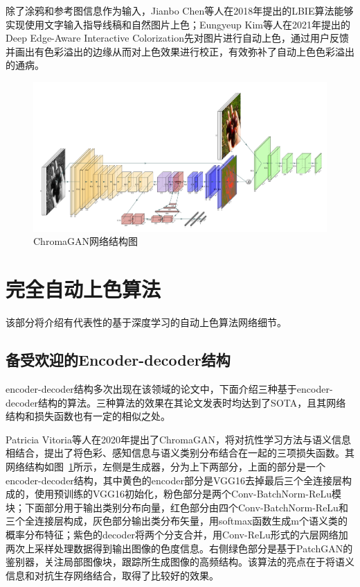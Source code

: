 \documentclass[conference]{IEEEtran}
\begin{document}
除了涂鸦和参考图信息作为输入，Jianbo Chen等人在2018年提出的LBIE算法\cite{chen2018language}能够实现使用文字输入指导线稿和自然图片上色；Eungyeup Kim等人在2021年提出的Deep Edge-Aware Interactive Colorization\cite{kim2021deep}先对图片进行自动上色，通过用户反馈并画出有色彩溢出的边缘从而对上色效果进行校正，有效弥补了自动上色色彩溢出的通病。
\begin{figure}[htb]
    \centerline{\includegraphics[totalheight = 2.5in]{2019ChromaGAN.png}}
    \caption{ChromaGAN网络结构图}
    \label{2019ChromaGAN}
    \end{figure}
\section{完全自动上色算法}
该部分将介绍有代表性的基于深度学习的自动上色算法网络细节。

\subsection{备受欢迎的Encoder-decoder结构}
encoder-decoder结构多次出现在该领域的论文中，下面介绍三种基于encoder-decoder结构的算法。三种算法的效果在其论文发表时均达到了SOTA，且其网络结构和损失函数也有一定的相似之处。

Patricia Vitoria等人在2020年提出了ChromaGAN\cite{2019ChromaGAN}，将对抗性学习方法与语义信息相结合，提出了将色彩、感知信息与语义类别分布结合在一起的三项损失函数。其网络结构如图~\ref{2019ChromaGAN}所示，左侧是生成器，分为上下两部分，上面的部分是一个encoder-decoder结构，其中黄色的encoder部分是VGG16\cite{simonyan2014very}去掉最后三个全连接层构成的，使用预训练的VGG16初始化，粉色部分是两个Conv-BatchNorm-ReLu模块；下面部分用于输出类别分布向量，红色部分由四个Conv-BatchNorm-ReLu和三个全连接层构成，灰色部分输出类分布矢量，用softmax函数生成m个语义类的概率分布特征；紫色的decoder将两个分支合并，用Conv-ReLu形式的六层网络加两次上采样处理数据得到输出图像的色度信息。右侧绿色部分是基于PatchGAN\cite{isola2017image}的鉴别器，关注局部图像块，跟踪所生成图像的高频结构。该算法的亮点在于将语义信息和对抗生存网络结合，取得了比较好的效果。
\end{document}
